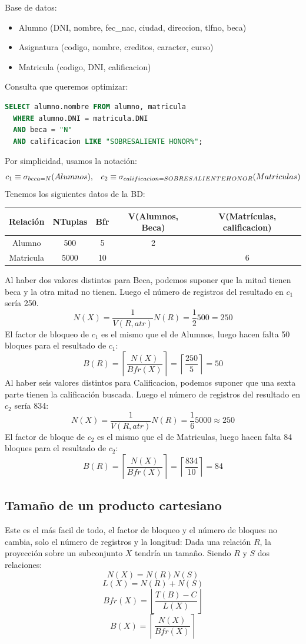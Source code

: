 \begin{example}
Base de datos:
\begin{itemize}
\item Alumno (DNI, nombre, fec\_nac, ciudad, direccion, tlfno, beca)
\item Asignatura (codigo, nombre, creditos, caracter, curso)
\item Matricula (codigo, DNI, calificacion)
\end{itemize}
Consulta que queremos optimizar:
\begin{lstlisting}[language=sql]
  SELECT alumno.nombre FROM alumno, matricula 
  WHERE alumno.DNI = matricula.DNI 
  AND beca = "N"
  AND calificacion LIKE "SOBRESALIENTE HONOR%";
\end{lstlisting}
Por simplicidad, usamos la notación:
\[
c_1\equiv \sigma_{beca=N}(Alumnos), \;\;\; c_2\equiv \sigma_{calificacion=SOBRESALIENTEHONOR}(Matriculas)
\]
Tenemos los siguientes datos de la BD:
\begin{center}
\begin{tabular}{|c|c|c|c|c|}
\hline 
Relación & NTuplas & Bfr & V(Alumnos, Beca) & V(Matrículas, calificacion) \\ 
\hline 
Alumno & 500 & 5 & 2 &   \\ 
\hline 
Matricula & 5000 & 10  &   & 6 \\ 
\hline 
\end{tabular}
\end{center}
Al haber dos valores distintos para Beca, podemos suponer que la mitad tienen beca y la otra mitad no tienen. Luego el número de registros del resultado en $c_1$ sería 250.
\[
N(X)=\frac{1}{V(R,atr)}N(R)=\frac{1}{2}500=250
\]
El factor de bloqueo de $c_1$ es el mismo que el de Alumnos, luego hacen falta 50 bloques para el resultado de $c_1$:
\[
B(R)=\left\lceil\frac{N(X)}{Bfr(X)}\right\rceil=\left\lceil\frac{250}{5}\right\rceil=50
\]
Al haber seis valores distintos para Calificacion, podemos suponer que una sexta parte tienen la calificación buscada. Luego el número de registros del resultado en $c_2$ sería 834:
\[
N(X)=\frac{1}{V(R,atr)}N(R)=\frac{1}{6}5000\approx 250
\]
El factor de bloque de $c_2$ es el mismo que el de Matriculas, luego hacen falta 84 bloques para el resultado de $c_2$:
\[
B(R)=\left\lceil\frac{N(X)}{Bfr(X)}\right\rceil=\left\lceil\frac{834}{10}\right\rceil=84
\]
\end{example}
\subsection{Tamaño de un producto cartesiano}
Este es el más facil de todo, el factor de bloqueo y el número de bloques no cambia, solo el número de registros y la longitud:
Dada una relación $R$, la proyección sobre un subconjunto $X$ tendría un tamaño. Siendo $R$ y $S$ dos relaciones:
\[
N(X)=N(R)N(S)
\]
\[
L(X)=N(R)+N(S)
\]
\[
Bfr(X)=\left\lfloor\frac{T(B)-C}{L(X)}\right\rfloor
\]
\[
B(X)=\left\lceil\frac{N(X)}{Bfr(X)}\right\rceil
\]
